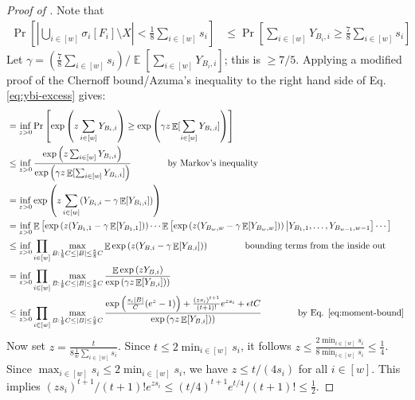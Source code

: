 \documentclass[10pt]{article}
\theoremstyle{definition}\newtheorem{definition}[lemma]{Definition}
\theoremstyle{remark}  \newtheorem*{remark}{Remark}
\DeclareMathOperator{\EE}{\mathbb{E}}
\begin{document}
\begin{proof}[Proof of ]
  Note that
  \begin{align}
    \Pr\left[\left| \bigcup_{i \in [w]} \sigma_i[F_i] \setminus X \right|  < \frac{1}{8} \sum_{i \in [w]} s_i \right] & \le \Pr\left[\sum_{i \in [w]} Y_{B_i,i} \ge \frac{7}{8} \sum_{i\in[w]} s_i \right] \label{eq:ybi-excess}
  \end{align}
  Let $\gamma = (\frac{7}{8} \sum_{i\in[w]} s_i) / \EE[\sum_{i \in [w]} Y_{B_i,i}] $; this is $\ge 7/5$. Applying a modified proof of the Chernoff bound/Azuma's inequality to the right hand side of Eq. \ref{eq:ybi-excess} gives:
  \begin{align*}
    &= \inf_{z > 0} \Pr\left[\exp\left(z \sum_{i \in [w]} Y_{B_i,i}\right) \ge \exp\left(\gamma z \EE[\sum_{i \in [w]} Y_{B_i,i}]\right) \right] \\
    &\le  \inf_{z > 0} \frac{\exp\left(z \sum_{i \in [w]} Y_{B_i,i}\right) }{\exp\left(\gamma z \EE[\sum_{i \in [w]} Y_{B_i,i}]\right)} \qquad\qquad \text{by Markov's inequality} \\ 
    &= \inf_{z > 0} \exp\left(z \sum_{i \in [w]} (Y_{B_i,i} - \gamma \EE[Y_{B_i,i} ])\right) \\
    &= \inf_{z > 0} \EE\left[\exp\left(z (Y_{B_1,1} - \gamma \EE[Y_{B_1,1}])\right) \cdots \EE\left[\exp\left(z (Y_{B_w,w} - \gamma \EE[Y_{B_w,w}])\right) \big\vert Y_{B_1,1}, \ldots, Y_{B_{w-1},w-1}\right] \cdots  \right] \\
    &\le \inf_{z > 0} \prod_{i \in [w]} \max_{B: \frac{1}{8} C \le |B| \le \frac{5}{8} C} \EE \exp\left(z (Y_{B,i} - \gamma \EE[Y_{B,i}])\right) \qquad\qquad \text{bounding terms from the inside out} \\
    &= \inf_{z > 0} \prod_{i \in [w]} \max_{B: \frac{1}{8} C \le |B| \le \frac{5}{8} C} \frac{\EE \exp\left(z Y_{B,i}\right)}{\exp\left(\gamma z\EE[Y_{B,i}])\right) } \\
    &\le \inf_{z > 0} \prod_{i \in [w]} \max_{B: \frac{1}{8} C \le |B| \le \frac{5}{8} C} \frac{\exp\left({\frac{s_i |B|}{C} (e^z - 1)} \right) +\frac{(z s_i)^{t+1}}{(t+1)!} e^{z s_i} +  \epsilon t C}{\exp\left(\gamma z\EE[Y_{B,i}])\right) } \qquad\qquad \text{by Eq. \ref{eq:moment-bound} }
  \end{align*}
  Now set $z = \frac{t}{8 \frac{1}{w} \sum_{i\in[w]} s_i}$. Since $t \le 2 \min_{i \in [w]} s_i$, it follows $z \le \frac{2 \min_{i \in [w]} s_i}{8 \min_{i \in [w]} s_i} \le \frac{1}{4}$. Since $\max_{i \in [w]} s_i \le 2 \min_{i \in [w]} s_i$, we have $z \le t / (4 s_i)$ for all $i \in [w]$. This implies $(zs_i)^{t+1}/(t+1)! e^{z s_i} \le {(t/4)}^{t+1} e^{t/4} / (t+1)! \le \frac{1}{2}$.

\end{proof}
\end{document}
